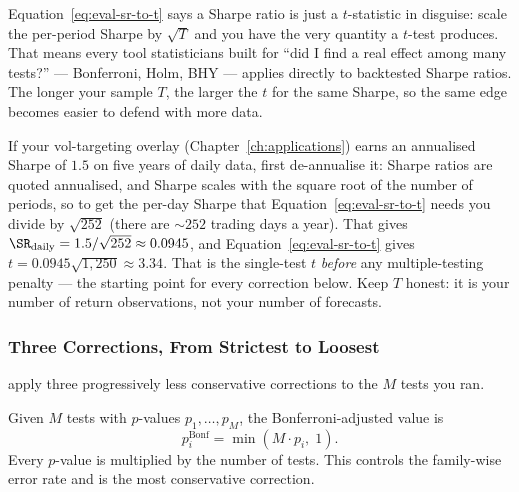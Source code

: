 \begin{intuition}
Equation~\eqref{eq:eval-sr-to-t} says a Sharpe ratio is just a $t$-statistic in disguise: scale the per-period Sharpe by $\sqrt{T}$ and you have the very quantity a $t$-test produces.
That means every tool statisticians built for ``did I find a real effect among many tests?'' --- Bonferroni, Holm, BHY --- applies directly to backtested Sharpe ratios.
The longer your sample $T$, the larger the $t$ for the same Sharpe, so the same edge becomes easier to defend with more data.
\end{intuition}

\begin{projectconnection}
If your vol-targeting overlay (Chapter~\ref{ch:applications}) earns an annualised Sharpe of $1.5$ on five years of daily data, first de-annualise it: Sharpe ratios are quoted annualised, and Sharpe scales with the square root of the number of periods, so to get the per-day Sharpe that Equation~\eqref{eq:eval-sr-to-t} needs you divide by $\sqrt{252}$ (there are ${\sim}252$ trading days a year). That gives $\SR_{\text{daily}} = 1.5/\sqrt{252} \approx 0.0945$, and Equation~\eqref{eq:eval-sr-to-t} gives $t = 0.0945\sqrt{1{,}250} \approx 3.34$.
That is the single-test $t$ \emph{before} any multiple-testing penalty --- the starting point for every correction below.
Keep $T$ honest: it is your number of return observations, not your number of forecasts.
\end{projectconnection}

\subsubsection{Three Corrections, From Strictest to Loosest}

\citet{HarveyLiu2015} apply three progressively less conservative corrections to the $M$ tests you ran.

\begin{definition}
Given $M$ tests with $p$-values $p_1,\ldots,p_M$, the Bonferroni-adjusted value is
\begin{equation}
\label{eq:eval-bonferroni}
p_i^{\text{Bonf}} = \min(M \cdot p_i,\; 1).
\end{equation}
Every $p$-value is multiplied by the number of tests. This controls the family-wise error rate and is the most conservative correction.
\end{definition}

